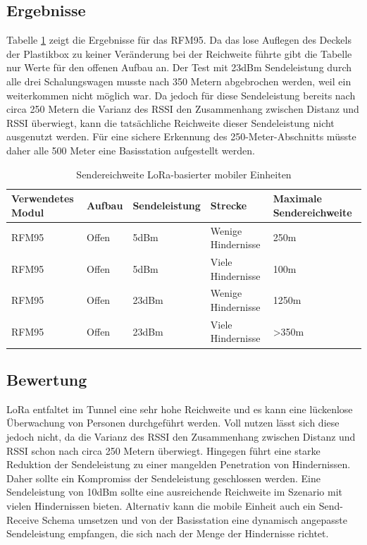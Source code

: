 \subsection{Ergebnisse}
Tabelle \ref{table:rangelora} zeigt die Ergebnisse für das RFM95.
Da das lose Auflegen des Deckels der Plastikbox zu keiner Veränderung bei der Reichweite führte gibt die Tabelle nur Werte für den offenen Aufbau an. 
Der Test mit 23dBm Sendeleistung durch alle drei Schalungswagen musste nach 350 Metern abgebrochen werden, weil ein weiterkommen nicht möglich war.
Da jedoch für diese Sendeleistung bereits nach circa 250 Metern die Varianz des RSSI den Zusammenhang zwischen Distanz und RSSI überwiegt, kann die tatsächliche Reichweite dieser Sendeleistung nicht ausgenutzt werden.
Für eine sichere Erkennung des 250-Meter-Abschnitts müsste daher alle 500 Meter eine Basisstation aufgestellt werden.

\begin{table}[h]
	\centering
	\caption{Sendereichweite LoRa-basierter mobiler Einheiten}
	\label{table:rangelora}
	\begin{tabular}{p{2.2cm}|p{1.5cm}|p{2.5cm}|p{3.5cm}|p{3cm}}
		Verwendetes Modul & Aufbau & Sendeleistung & Strecke & Maximale Sendereichweite \\
		\hline
		RFM95 & Offen & 5dBm & Wenige Hindernisse & 250m \\
		RFM95 & Offen & 5dBm & Viele Hindernisse & 100m \\
		\hline
		RFM95 & Offen & 23dBm & Wenige Hindernisse & 1250m \\
		RFM95 & Offen & 23dBm & Viele Hindernisse & >350m \\
	\end{tabular}
\end{table}

\subsection{Bewertung}
LoRa entfaltet im Tunnel eine sehr hohe Reichweite und es kann eine lückenlose Überwachung von Personen durchgeführt werden.
Voll nutzen lässt sich diese jedoch nicht, da die Varianz des RSSI den Zusammenhang zwischen Distanz und RSSI schon nach circa 250 Metern überwiegt. 
Hingegen führt eine starke Reduktion der Sendeleistung zu einer mangelden Penetration von Hindernissen.
Daher sollte ein Kompromiss der Sendeleistung geschlossen werden. 
Eine Sendeleistung von 10dBm sollte eine ausreichende Reichweite im Szenario mit vielen Hindernissen bieten.
Alternativ kann die mobile Einheit auch ein Send-Receive Schema umsetzen und von der Basisstation eine dynamisch angepasste Sendeleistung empfangen, die sich nach der Menge der Hindernisse richtet.


